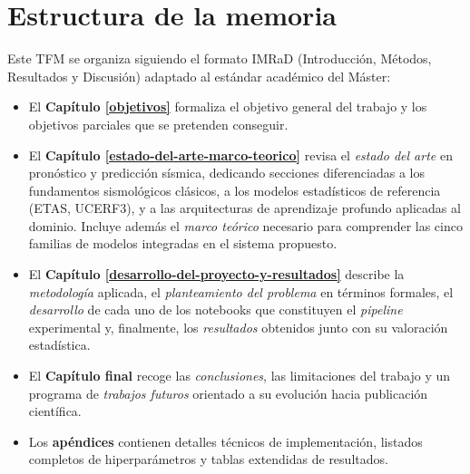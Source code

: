 \section{Estructura de la memoria}
\label{estructura-memoria}

Este TFM se organiza siguiendo el formato IMRaD (Introducción, Métodos, Resultados y Discusión) adaptado al estándar académico del Máster:

\begin{itemize}
  \item El \textbf{Capítulo \ref{objetivos}} formaliza el objetivo general del trabajo y los objetivos parciales que se pretenden conseguir.

  \item El \textbf{Capítulo \ref{estado-del-arte-marco-teorico}} revisa el \emph{estado del arte} en pronóstico y predicción sísmica, dedicando secciones diferenciadas a los fundamentos sismológicos clásicos, a los modelos estadísticos de referencia (ETAS, UCERF3), y a las arquitecturas de aprendizaje profundo aplicadas al dominio. Incluye además el \emph{marco teórico} necesario para comprender las cinco familias de modelos integradas en el sistema propuesto.

  \item El \textbf{Capítulo \ref{desarrollo-del-proyecto-y-resultados}} describe la \emph{metodología} aplicada, el \emph{planteamiento del problema} en términos formales, el \emph{desarrollo} de cada uno de los notebooks que constituyen el \emph{pipeline} experimental y, finalmente, los \emph{resultados} obtenidos junto con su valoración estadística.

  \item El \textbf{Capítulo final} recoge las \emph{conclusiones}, las limitaciones del trabajo y un programa de \emph{trabajos futuros} orientado a su evolución hacia publicación científica.

  \item Los \textbf{apéndices} contienen detalles técnicos de implementación, listados completos de hiperparámetros y tablas extendidas de resultados.
\end{itemize}
